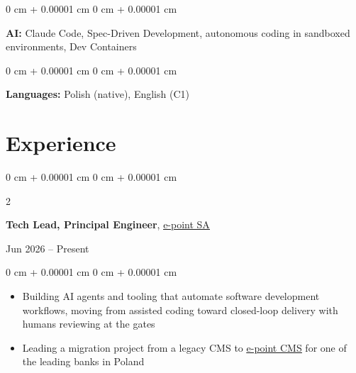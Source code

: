 \documentclass[10pt, letterpaper]{article}
\newenvironment{highlights}{
  \begin{itemize}[
        topsep=0.05 cm,
        parsep=0.05 cm,
        partopsep=0pt,
        itemsep=0pt,
        leftmargin=0 cm + 10pt
      ]
    }{
  \end{itemize}
} %
\newenvironment{onecolentry}{
  \begin{adjustwidth}{
      0 cm + 0.00001 cm
    }{
      0 cm + 0.00001 cm
    }
  }{
  \end{adjustwidth}
} %
\newenvironment{twocolentry}[2][]{
  \onecolentry
  \def\secondColumn{#2}
  \setcolumnwidth{\fill, 4.5 cm}
  \begin{paracol}{2}
  }{
    \switchcolumn \raggedleft \secondColumn
  \end{paracol}
  \endonecolentry
} %
\let\hrefOriginal\href
\renewcommand{\href}[2]{\hrefOriginal{#1}{\uline{#2}}}
\begin{document}
\vspace{0.05 cm}

\begin{onecolentry}
  \textbf{AI:} Claude Code, Spec-Driven Development, autonomous coding
  in sandboxed environments, Dev Containers
\end{onecolentry}

\vspace{0.05 cm}

\begin{onecolentry}
  \textbf{Languages:} Polish (native), English (C1)
\end{onecolentry}


\section{Experience}

\begin{twocolentry}
  { Jun 2026 – Present }
  \textbf{Tech Lead, Principal Engineer},
  \href{https://www.e-point.com/}{e-point SA}
\end{twocolentry}
\vspace{0.1 cm}
\begin{onecolentry}
  \begin{highlights}
  \item Building AI agents and tooling that automate software
    development workflows, moving from assisted coding toward
    closed-loop delivery with humans reviewing at the gates
  \item Leading a migration project from a legacy CMS to
    \href{https://www.e-point.com/produkty/e-point-cms}{e-point CMS}
    for one of the leading banks in Poland
  \end{highlights}
\end{onecolentry}

\vspace{0.1 cm}
\end{document}
